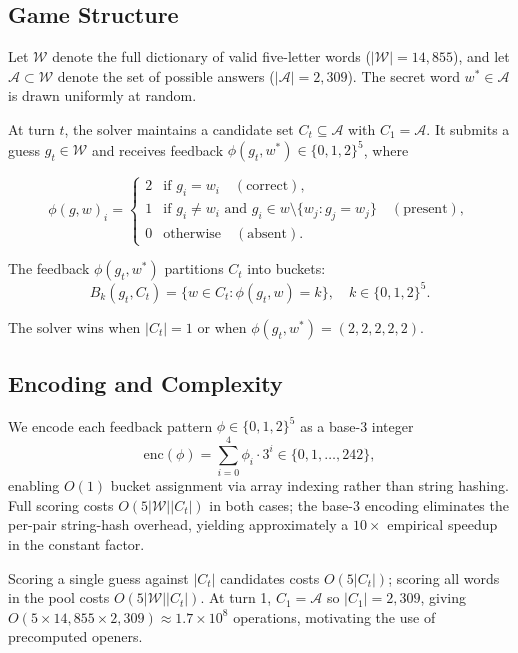 \documentclass{article}
\begin{document}
\subsection{Game Structure}

Let $\mathcal{W}$ denote the full dictionary of valid five-letter words
($|\mathcal{W}| = 14{,}855$), and let $\mathcal{A} \subset \mathcal{W}$ denote
the set of possible answers ($|\mathcal{A}| = 2{,}309$). The secret word
$w^* \in \mathcal{A}$ is drawn uniformly at random.

At turn $t$, the solver maintains a candidate set $C_t \subseteq \mathcal{A}$
with $C_1 = \mathcal{A}$. It submits a guess $g_t \in \mathcal{W}$ and receives
feedback $\phi(g_t, w^*) \in \{0,1,2\}^5$, where

\[
  \phi(g, w)_i = \begin{cases}
    2 & \text{if } g_i = w_i \quad (\text{correct}), \\
    1 & \text{if } g_i \neq w_i \text{ and } g_i \in w \setminus \{w_j : g_j = w_j\}
        \quad (\text{present}), \\
    0 & \text{otherwise} \quad (\text{absent}).
  \end{cases}
\]

The feedback $\phi(g_t, w^*)$ partitions $C_t$ into buckets:
\[
  B_k(g_t, C_t) = \{w \in C_t : \phi(g_t, w) = k\}, \quad k \in \{0,1,2\}^5.
\]

The solver wins when $|C_t| = 1$ or when $\phi(g_t, w^*) = (2,2,2,2,2)$.

\subsection{Encoding and Complexity}

We encode each feedback pattern $\phi \in \{0,1,2\}^5$ as a base-3 integer
\[
  \mathrm{enc}(\phi) = \sum_{i=0}^{4} \phi_i \cdot 3^i \in \{0, 1, \ldots, 242\},
\]
enabling $O(1)$ bucket assignment via array indexing rather than string hashing.
Full scoring costs $O(5|\mathcal{W}||C_t|)$ in both cases; the base-3 encoding
eliminates the per-pair string-hash overhead, yielding approximately a $10\times$
empirical speedup in the constant factor.

Scoring a single guess against $|C_t|$ candidates costs $O(5|C_t|)$; scoring all
words in the pool costs $O(5|\mathcal{W}||C_t|)$. At turn 1, $C_1 = \mathcal{A}$
so $|C_1| = 2{,}309$, giving
$O(5 \times 14{,}855 \times 2{,}309) \approx 1.7 \times 10^8$
operations, motivating the use of precomputed openers.
\end{document}
